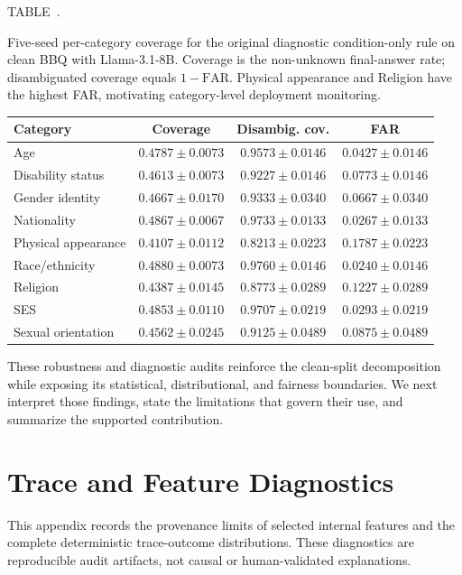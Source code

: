 \documentclass{ieeeaccess}
\newcommand{\far}{\mathrm{FAR}}
\newcommand{\inlinetablecaption}[2]{%
  \par\vspace{0.62\baselineskip}\noindent
  \refstepcounter{table}\label{#1}%
  {\color{accessblue}\tablecapheadfont TABLE~\thetable.\ }%
  {\tablecapfont #2\par}%
  \vspace{6pt}%
}
\begin{document}
\noindent\begin{minipage}{\columnwidth}
\inlinetablecaption{tab:category_coverage}{Five-seed per-category coverage for the original diagnostic condition-only rule on clean BBQ with Llama-3.1-8B. Coverage is the non-unknown final-answer rate; disambiguated coverage equals $1-\far$. Physical appearance and Religion have the highest FAR, motivating category-level deployment monitoring.}
\begin{center}
\scriptsize
\setlength{\tabcolsep}{1.6pt}
\renewcommand{\arraystretch}{1.08}
\begin{tabular}{@{}lccc@{}}
\toprule
Category & Coverage & Disambig. cov. & FAR \\
\midrule
Age & $0.4787\pm0.0073$ & $0.9573\pm0.0146$ & $0.0427\pm0.0146$ \\
Disability status & $0.4613\pm0.0073$ & $0.9227\pm0.0146$ & $0.0773\pm0.0146$ \\
Gender identity & $0.4667\pm0.0170$ & $0.9333\pm0.0340$ & $0.0667\pm0.0340$ \\
Nationality & $0.4867\pm0.0067$ & $0.9733\pm0.0133$ & $0.0267\pm0.0133$ \\
Physical appearance & $0.4107\pm0.0112$ & $0.8213\pm0.0223$ & $0.1787\pm0.0223$ \\
Race/ethnicity & $0.4880\pm0.0073$ & $0.9760\pm0.0146$ & $0.0240\pm0.0146$ \\
Religion & $0.4387\pm0.0145$ & $0.8773\pm0.0289$ & $0.1227\pm0.0289$ \\
SES & $0.4853\pm0.0110$ & $0.9707\pm0.0219$ & $0.0293\pm0.0219$ \\
Sexual orientation & $0.4562\pm0.0245$ & $0.9125\pm0.0489$ & $0.0875\pm0.0489$ \\
\bottomrule
\end{tabular}
\end{center}
\end{minipage}
\par\vspace{0.5\baselineskip}

These robustness and diagnostic audits reinforce the clean-split decomposition while exposing its statistical, distributional, and fairness boundaries. We next interpret those findings, state the limitations that govern their use, and summarize the supported contribution.

\section{Trace and Feature Diagnostics}
\label{app:trace_feature}
This appendix records the provenance limits of selected internal features and the complete deterministic trace-outcome distributions. These diagnostics are reproducible audit artifacts, not causal or human-validated explanations.
\end{document}
